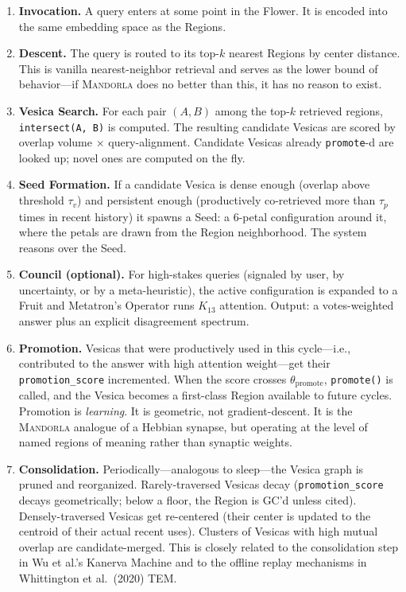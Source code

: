 \documentclass[11pt,a4paper]{article}
\begin{document}
\begin{enumerate}[leftmargin=*]
  \item \textbf{Invocation.} A query enters at some point in the Flower. It is encoded into the same embedding space as the Regions.
  \item \textbf{Descent.} The query is routed to its top-$k$ nearest Regions by center distance. This is vanilla nearest-neighbor retrieval and serves as the lower bound of behavior---if \textsc{Mandorla} does no better than this, it has no reason to exist.
  \item \textbf{Vesica Search.} For each pair $(A, B)$ among the top-$k$ retrieved regions, \texttt{intersect(A, B)} is computed. The resulting candidate Vesicas are scored by overlap volume $\times$ query-alignment. Candidate Vesicas already \texttt{promote}-d are looked up; novel ones are computed on the fly.
  \item \textbf{Seed Formation.} If a candidate Vesica is dense enough (overlap above threshold $\tau_v$) and persistent enough (productively co-retrieved more than $\tau_p$ times in recent history) it spawns a Seed: a 6-petal configuration around it, where the petals are drawn from the Region neighborhood. The system reasons over the Seed.
  \item \textbf{Council (optional).} For high-stakes queries (signaled by user, by uncertainty, or by a meta-heuristic), the active configuration is expanded to a Fruit and Metatron's Operator runs $K_{13}$ attention. Output: a votes-weighted answer plus an explicit disagreement spectrum.
  \item \textbf{Promotion.} Vesicas that were productively used in this cycle---i.e., contributed to the answer with high attention weight---get their \texttt{promotion\_score} incremented. When the score crosses $\theta_{\text{promote}}$, \texttt{promote()} is called, and the Vesica becomes a first-class Region available to future cycles. Promotion is \emph{learning}. It is geometric, not gradient-descent. It is the \textsc{Mandorla} analogue of a Hebbian synapse, but operating at the level of named regions of meaning rather than synaptic weights.
  \item \textbf{Consolidation.} Periodically---analogous to sleep---the Vesica graph is pruned and reorganized. Rarely-traversed Vesicas decay (\texttt{promotion\_score} decays geometrically; below a floor, the Region is GC'd unless cited). Densely-traversed Vesicas get re-centered (their center is updated to the centroid of their actual recent uses). Clusters of Vesicas with high mutual overlap are candidate-merged. This is closely related to the consolidation step in Wu et al.'s Kanerva Machine and to the offline replay mechanisms in Whittington et al.\ (2020) TEM.
\end{enumerate}
\end{document}
